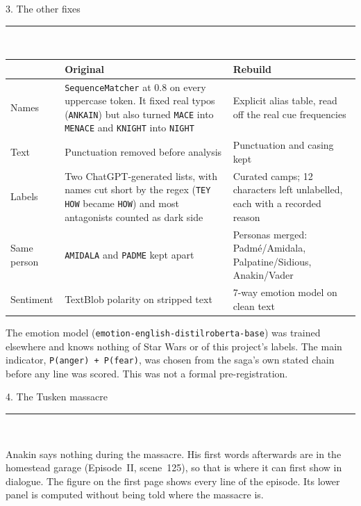 \documentclass[11pt,a4paper]{article}
\newcommand{\heading}[1]{%
  \penalty-150\vspace{1.5em}%
  {\headingfont\fontsize{13.5}{16}\selectfont\color{ink}#1}\\[0.35em]%
  {\color{rule}\rule{\linewidth}{0.7pt}}\\[0.15em]%
  \nopagebreak}
\begin{document}
\newpage
\heading{3. The other fixes}

\begin{table}[H]
\small
\begin{tabularx}{\linewidth}{lXX}
\toprule
 & \textbf{Original} & \textbf{Rebuild} \\
\midrule
Names &
\texttt{SequenceMatcher} at 0.8 on every uppercase token. It fixed real typos (\texttt{ANKAIN})
but also turned \texttt{MACE} into \texttt{MENACE} and \texttt{KNIGHT} into \texttt{NIGHT} &
Explicit alias table, read off the real cue frequencies \\
\addlinespace
Text &
Punctuation removed before analysis &
Punctuation and casing kept \\
\addlinespace
Labels &
Two ChatGPT-generated lists, with names cut short by the regex (\texttt{TEY HOW} became
\texttt{HOW}) and most antagonists counted as dark side &
Curated camps; 12 characters left unlabelled, each with a recorded reason \\
\addlinespace
Same person &
\texttt{AMIDALA} and \texttt{PADME} kept apart &
Personas merged: Padm\'e/Amidala, Palpatine/Sidious, Anakin/Vader \\
\addlinespace
Sentiment &
TextBlob polarity on stripped text &
7-way emotion model on clean text \\
\bottomrule
\end{tabularx}
\end{table}

The emotion model (\texttt{emotion-english-distilroberta-base}) was trained elsewhere and knows
nothing of Star Wars or of this project's labels. The main indicator, \texttt{P(anger) + P(fear)},
was chosen from the saga's own stated chain before any line was scored. This was not a formal
pre-registration.

\heading{4. The Tusken massacre}

Anakin says nothing during the massacre. His first words afterwards are in the homestead garage
(Episode~II, scene~125), so that is where it can first show in dialogue. The figure on the first
page shows every line of the episode. Its lower panel is computed without being told where the
massacre is.
\end{document}
